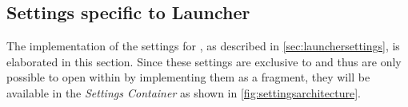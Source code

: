 \subsection{Settings specific to Launcher}
The implementation of the settings for \launcher, as described in \cref{sec:launchersettings}, is elaborated in this section.
Since these settings are exclusive to \launcher and thus are only possible to open within \settingsactivity by implementing them as a fragment, they will be available in the \textit{Settings Container} as shown in \cref{fig:settingsarchitecture}.